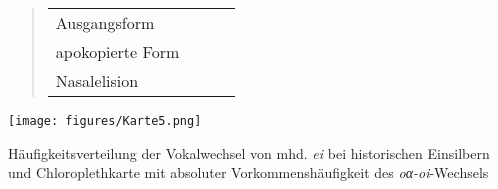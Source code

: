 \begin{quote}\centering
\begin{tabularx}{.7\textwidth}{lQQQ}
Ausgangsform  &  &  &  \\
apokopierte Form &  & &  \\
Nasalelision  &  \textit{}  &  \textit{} &\\
\end{tabularx}
\end{quote}

\begin{map}[p]
\texttt{[image: figures/Karte5.png]}
\caption{Häufigkeitsverteilung der Vokalwechsel von mhd. \textit{ei} bei historischen Einsilbern und Chloroplethkarte mit absoluter Vorkommenshäufigkeit des \textit{oα-oi}{}-Wechsels}
\label{map:5}
\end{map}

